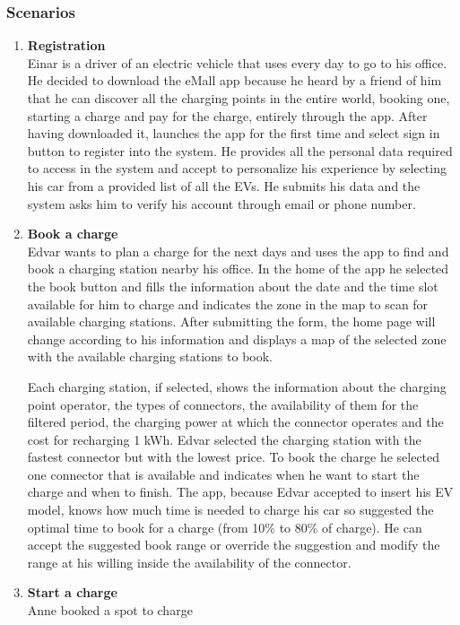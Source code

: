 \subsubsection{Scenarios}
\begin{enumerate}[label=\textbf{\Alph*}.]
      \item \textbf{Registration} \\
            Einar is a driver of an electric vehicle that uses every day to go to his
            office. He decided to download the eMall app because he heard by a friend
            of him that he can discover all the charging points in the entire world,
            booking one, starting a charge and pay for the charge, entirely through
            the app. After having downloaded it, launches the app for the first time
            and select sign in button to register into the system. He provides all
            the personal data required to access in the system and accept to personalize
            his experience by selecting his car from a provided list of all the EVs.
            He submits his data and the system asks him to verify his account through email or phone number.
      \item \textbf{Book a charge} \\
            Edvar wants to plan a charge for the next days and uses the app to find and book a charging
            station nearby his office. In the home of the app he selected the book button and fills the
            information about the date and the time slot available for him to charge and indicates the
            zone in the map to scan for available charging stations. After submitting the form, the home page
            will change according to his information and displays a map of the selected zone with the available
            charging stations to book.

            Each charging station, if selected, shows the information about the charging point operator,
            the types of connectors, the availability of them for the filtered period,
            the charging power at which the connector operates and the cost for recharging 1 kWh.
            Edvar selected the charging station with the fastest connector but with the lowest price.
            To book the charge he selected one connector that is available and indicates when he want to start the charge
            and when to finish.
            The app, because Edvar accepted to insert his EV model, knows how much time is needed to charge his car so suggested
            the optimal time to book for a charge (from 10\% to 80\% of charge).
            He can accept the suggested book range or override the suggestion and modify the range at his willing inside the
            availability of the connector.
      \item \textbf{Start a charge} \\
            Anne booked a spot to charge
\end{enumerate}

